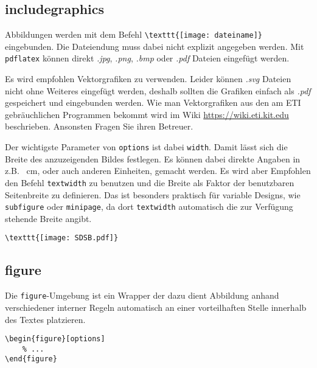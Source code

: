 \subsection{includegraphics}
Abbildungen werden mit dem Befehl \verb|\texttt{[image: dateiname]}| eingebunden. Die Dateiendung muss dabei nicht explizit angegeben werden. Mit \verb|pdflatex| können direkt \textit{.jpg}, \textit{.png}, \textit{.bmp} oder \textit{.pdf} Dateien eingefügt werden. 

Es wird empfohlen Vektorgrafiken zu verwenden. Leider können \textit{.svg} Dateien nicht ohne Weiteres eingefügt werden, deshalb sollten die Grafiken einfach als \textit{.pdf} gespeichert und eingebunden werden. Wie man Vektorgrafiken aus den am \gls{ETI} gebräuchlichen Programmen bekommt wird im Wiki \url{https://wiki.eti.kit.edu} beschrieben. Ansonsten Fragen Sie ihren Betreuer.

Der wichtigste Parameter von \verb|options| ist dabei \verb|width|. Damit lässt sich die Breite des anzuzeigenden Bildes festlegen. Es können dabei direkte Angaben in z.B. \SI{}{\centi\meter}, oder auch anderen Einheiten, gemacht werden. Es wird aber Empfohlen den Befehl \verb|textwidth| zu benutzen und die Breite als Faktor der benutzbaren Seitenbreite zu definieren. Das ist besonders praktisch für variable Designs, wie \verb|subfigure| oder \verb|minipage|, da dort \verb|textwidth| automatisch die zur Verfügung stehende Breite angibt.

\begin{lstlisting}[style=latex]
\texttt{[image: SDSB.pdf]}
\end{lstlisting}

\subsection{figure}
Die \verb|figure|-Umgebung ist ein Wrapper der dazu dient Abbildung anhand verschiedener interner Regeln automatisch an einer vorteilhaften Stelle innerhalb des Textes platzieren.
\begin{lstlisting}[style=latex]
\begin{figure}[options]
	% ...
\end{figure}
\end{lstlisting}

